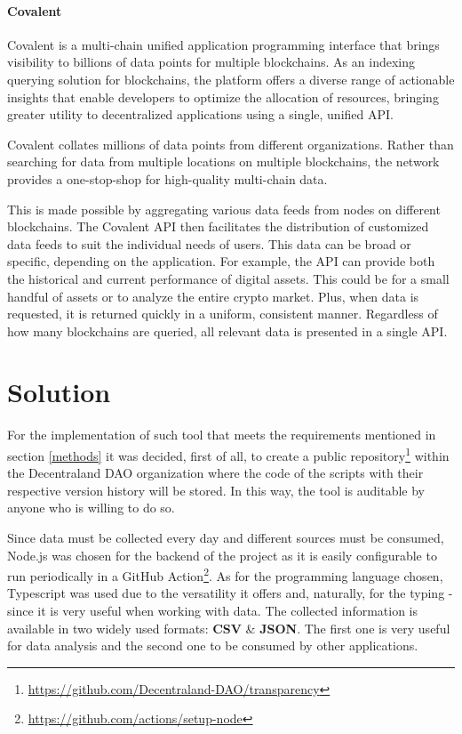 \documentclass[MSE,Master,english]{twbook}%
\begin{document}
\subsubsection{Covalent}
Covalent\cite{covalent} is a multi-chain unified application programming interface that brings visibility to billions of data points for multiple blockchains. As an indexing querying solution for blockchains, the platform offers a diverse range of actionable insights that enable developers to optimize the allocation of resources, bringing greater utility to decentralized applications using a single, unified API.

Covalent collates millions of data points from different organizations. Rather than searching for data from multiple locations on multiple blockchains, the network provides a one-stop-shop for high-quality multi-chain data.

This is made possible by aggregating various data feeds from nodes on different blockchains. The Covalent API then facilitates the distribution of customized data feeds to suit the individual needs of users. This data can be broad or specific, depending on the application. For example, the API can provide both the historical and current performance of digital assets. This could be for a small handful of assets or to analyze the entire crypto market. Plus, when data is requested, it is returned quickly in a uniform, consistent manner. Regardless of how many blockchains are queried, all relevant data is presented in a single API.

\chapter{Solution}
For the implementation of such tool that meets the requirements mentioned in section \ref{methods} it was decided, first of all, to create a public repository\footnote{\url{https://github.com/Decentraland-DAO/transparency}} within the Decentraland DAO organization where the code of the scripts with their respective version history will be stored. In this way, the tool is auditable by anyone who is willing to do so.

Since data must be collected every day and different sources must be consumed, Node.js was chosen for the backend of the project as it is easily configurable to run periodically in a GitHub Action\footnote{\url{https://github.com/actions/setup-node}}. As for the programming language chosen, Typescript was used due to the versatility it offers and, naturally, for the typing - since it is very useful when working with data. The collected information is available in two widely used formats: \textbf{CSV} \& \textbf{JSON}. The first one is very useful for data analysis and the second one to be consumed by other applications.
\end{document}
